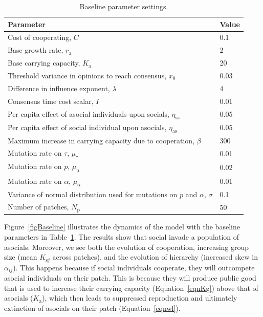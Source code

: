 \documentclass{rstb}
\begin{document}
\begin{linenumbers}
\begin{table}[!p]
	\centering
	\caption{Baseline parameter settings.}
		\begin{tabular}{|p{4.5in}|l|}
		\hline
		\textbf{Parameter} & \textbf{Value} \\ \hline
		Cost of cooperating, $C$ & 0.1 \\ \hline
		Base growth rate, $r_{\mathrm{a}}$ & 2 \\ \hline
            Base carrying capacity, $K_{\mathrm{a}}$ & 20 \\ \hline
            Threshold variance in opinions to reach consensus,  $x_\mathrm{\theta}$ & 0.03 \\ \hline
            Difference in influence exponent, $\lambda$ & 4 \\ \hline
            Consensus time cost scalar, $I$ & 0.01 \\ \hline
		Per capita effect of asocial individuals upon socials, $\eta_{\mathrm{sa}}$ & 0.05 \\ \hline
		Per capita effect of social individual upon asocials, $\eta_{\mathrm{as}}$ & 0.05 \\ \hline
		Maximum increase in carrying capacity due to cooperation, $\beta$ & 300 \\ \hline
		Mutation rate on $\tau$, $\mu_\mathrm{\tau}$ & 0.01 \\ \hline
            Mutation rate on $p$, $\mu_\mathrm{p}$ & 0.02 \\ \hline
            Mutation rate on $\alpha$, $\mu_\mathrm{\alpha}$ & 0.01 \\ \hline
		Variance of normal distribution used for mutations on $p$ and $\alpha$, $\sigma$ & 0.1 \\ \hline
		Number of patches, $N_\mathrm{p}$ & 50 \\ \hline	
		\end{tabular}
	
	\label{tabModParams}
\end{table} 

Figure~\ref{figBaseline} illustrates the dynamics of the model with the baseline parameters in Table~\ref{tabModParams}. The results show that social invade a population of asocials. Moreover, we see both the evolution of cooperation, increasing group size (mean $K_{\mathrm{s}j}$ across patches), and the evolution of hierarchy (increased skew in $\alpha_{ij}$). This happens because if social individuals cooperate, they will outcompete asocial individuals on their patch. This is because they will produce public good that is used to increase their carrying capacity (Equation~\ref{eqnKg}) above that of asocials ($K_\mathrm{a}$), which then leads to suppressed reproduction and ultimately extinction of asocials on their patch (Equation~\ref{eqnwl}). 


\end{linenumbers}
\end{document}
